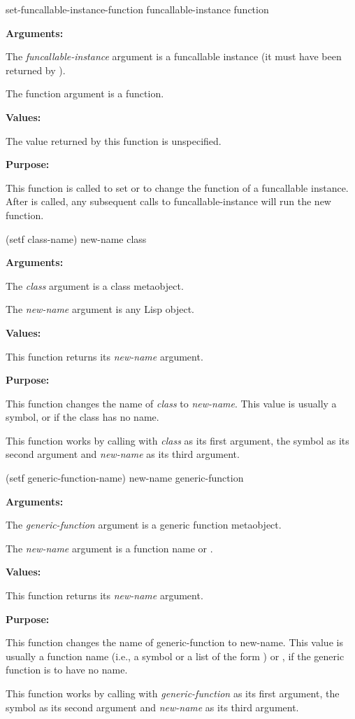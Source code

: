 \begin{defun}[Function]
set-funcallable-instance-function funcallable-instance function

\textbf{Arguments:}

The \emph{funcallable-instance} argument is a funcallable instance (it must have
been returned by ).

The function argument is a function.

\textbf{Values:}

The value returned by this function is unspecified.

\textbf{Purpose:}

This function is called to set or to change the function of a funcallable
instance. After  is called, any subsequent
calls to funcallable-instance will run the new function.
\end{defun}

\begin{defun}[Function]
(setf class-name) new-name class

\textbf{Arguments:}

The \emph{class} argument is a class metaobject.

The \emph{new-name} argument is any Lisp object.

\textbf{Values:}

This function returns its \emph{new-name} argument.

\textbf{Purpose:}

This function changes the name of \emph{class} to \emph{new-name}. This value is
usually a symbol, or  if the class has no name.

This function works by calling  with \emph{class} as
its first argument, the symbol  as its second argument and
\emph{new-name} as its third argument.
\end{defun}

\begin{defun}[Function]
(setf generic-function-name) new-name generic-function

\textbf{Arguments:}

The \emph{generic-function} argument is a generic function metaobject.

The \emph{new-name} argument is a function name or .

\textbf{Values:}

This function returns its \emph{new-name} argument.

\textbf{Purpose:}

This function changes the name of generic-function to new-name. This value is
usually a function name (i.e., a symbol or a list of the form ) or , if the generic function is to have no name.

This function works by calling  with
\emph{generic-function} as its first argument, the symbol  as its
second argument and \emph{new-name} as its third argument.
\end{defun}

